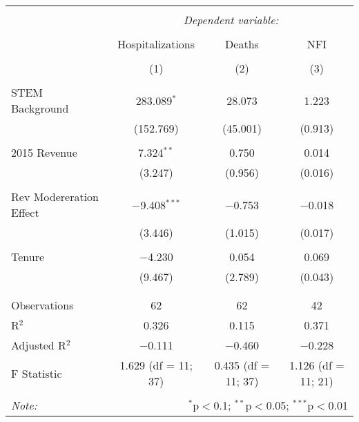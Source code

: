 
\begin{table}[!htbp] \centering 
  \caption{} 
  \label{} 
\begin{tabular}{@{\extracolsep{5pt}}lccc} 
\\[-1.8ex]\hline 
\hline \\[-1.8ex] 
 & \multicolumn{3}{c}{\textit{Dependent variable:}} \\ 
\cline{2-4} 
\\[-1.8ex] & Hospitalizations & Deaths & NFI \\ 
\\[-1.8ex] & (1) & (2) & (3)\\ 
\hline \\[-1.8ex] 
 STEM Background & 283.089$^{*}$ & 28.073 & 1.223 \\ 
  & (152.769) & (45.001) & (0.913) \\ 
  & & & \\ 
 2015 Revenue & 7.324$^{**}$ & 0.750 & 0.014 \\ 
  & (3.247) & (0.956) & (0.016) \\ 
  & & & \\ 
 Rev Modereration Effect & $-$9.408$^{***}$ & $-$0.753 & $-$0.018 \\ 
  & (3.446) & (1.015) & (0.017) \\ 
  & & & \\ 
 Tenure & $-$4.230 & 0.054 & 0.069 \\ 
  & (9.467) & (2.789) & (0.043) \\ 
  & & & \\ 
\hline \\[-1.8ex] 
Observations & 62 & 62 & 42 \\ 
R$^{2}$ & 0.326 & 0.115 & 0.371 \\ 
Adjusted R$^{2}$ & $-$0.111 & $-$0.460 & $-$0.228 \\ 
F Statistic & 1.629 (df = 11; 37) & 0.435 (df = 11; 37) & 1.126 (df = 11; 21) \\ 
\hline 
\hline \\[-1.8ex] 
\textit{Note:}  & \multicolumn{3}{r}{$^{*}$p$<$0.1; $^{**}$p$<$0.05; $^{***}$p$<$0.01} \\ 
\end{tabular} 
\end{table} 

